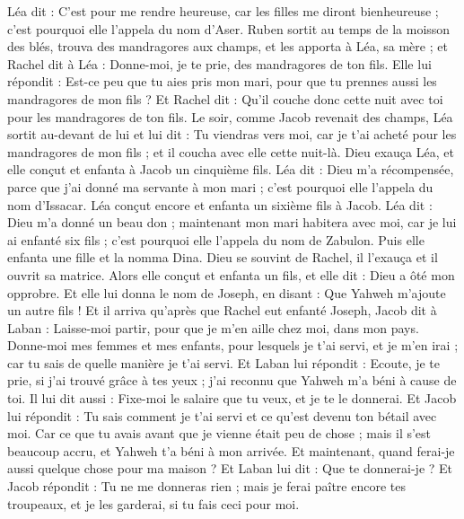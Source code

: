 \begin{multicols}{2}
Léa dit : C'est pour me rendre heureuse, car les filles me diront bienheureuse ; c'est pourquoi elle l'appela du nom d'Aser.
Ruben sortit au temps de la moisson des blés, trouva des mandragores aux champs, et les apporta à Léa, sa mère ; et Rachel dit à Léa : Donne-moi, je te prie, des mandragores de ton fils.
Elle lui répondit : Est-ce peu que tu aies pris mon mari, pour que tu prennes aussi les mandragores de mon fils ? Et Rachel dit : Qu'il couche donc cette nuit avec toi pour les mandragores de ton fils.
Le soir, comme Jacob revenait des champs, Léa sortit au-devant de lui et lui dit : Tu viendras vers moi, car je t'ai acheté pour les mandragores de mon fils ; et il coucha avec elle cette nuit-là.
Dieu exauça Léa, et elle conçut et enfanta à Jacob un cinquième fils.
Léa dit : Dieu m'a récompensée, parce que j'ai donné ma servante à mon mari ; c'est pourquoi elle l'appela du nom d'Issacar.
Léa conçut encore et enfanta un sixième fils à Jacob.
Léa dit : Dieu m'a donné un beau don ; maintenant mon mari habitera avec moi, car je lui ai enfanté six fils ; c'est pourquoi elle l'appela du nom de Zabulon.
Puis elle enfanta une fille et la nomma Dina.
Dieu se souvint de Rachel, il l'exauça et il ouvrit sa matrice.
Alors elle conçut et enfanta un fils, et elle dit : Dieu a ôté mon opprobre.
Et elle lui donna le nom de Joseph, en disant : Que Yahweh m'ajoute un autre fils !
Et il arriva qu'après que Rachel eut enfanté Joseph, Jacob dit à Laban : Laisse-moi partir, pour que je m'en aille chez moi, dans mon pays.
Donne-moi mes femmes et mes enfants, pour lesquels je t'ai servi, et je m'en irai ; car tu sais de quelle manière je t'ai servi.
Et Laban lui répondit : Ecoute, je te prie, si j'ai trouvé grâce à tes yeux ; j'ai reconnu que Yahweh m'a béni à cause de toi.
Il lui dit aussi : Fixe-moi le salaire que tu veux, et je te le donnerai.
Et Jacob lui répondit : Tu sais comment je t'ai servi et ce qu'est devenu ton bétail avec moi.
Car ce que tu avais avant que je vienne était peu de chose ; mais il s'est beaucoup accru, et Yahweh t'a béni à mon arrivée. Et maintenant, quand ferai-je aussi quelque chose pour ma maison ?
Et Laban lui dit : Que te donnerai-je ? Et Jacob répondit : Tu ne me donneras rien ; mais je ferai paître encore tes troupeaux, et je les garderai, si tu fais ceci pour moi.

\end{multicols}
